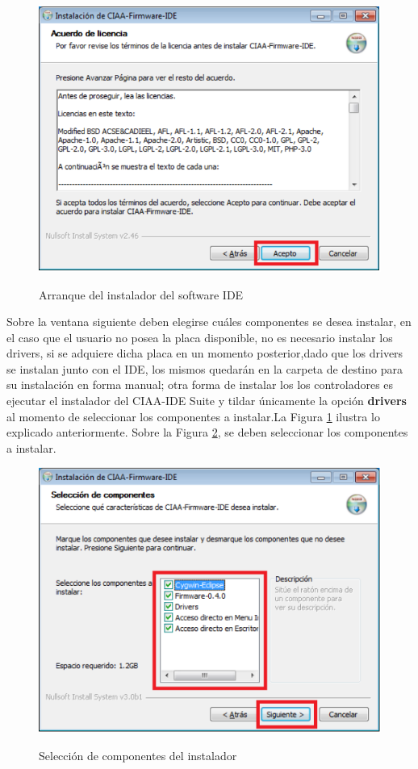\documentclass[12pt,letterpaper]{article}
\begin{document}
\begin{figure}[!h]
\centering
\includegraphics[width=8 cm]{figuras/instalacion2.png}\\
\caption{Arranque del instalador del software IDE}
\label{Fig5}
\end{figure}

Sobre la ventana siguiente deben elegirse cuáles componentes se desea instalar, en el caso que el usuario no posea  la placa disponible, no es necesario instalar los drivers, si se adquiere dicha placa en un momento posterior,dado que los drivers se instalan junto con el IDE, los mismos quedarán en la carpeta de destino para su instalación en forma manual; otra forma de instalar los  los controladores es ejecutar el instalador del CIAA-IDE Suite y tildar únicamente la opción \textbf{drivers} al momento de seleccionar los componentes a instalar.La Figura \ref{Fig5} ilustra lo explicado anteriormente. Sobre la Figura \ref{Fig6}, se deben seleccionar los componentes a instalar.

\begin{figure}[!h]
\centering
\includegraphics[width=8 cm]{figuras/instalacion3.png}\\
\caption{Selección de componentes del instalador}
\label{Fig6}
\end{figure}
\end{document}
